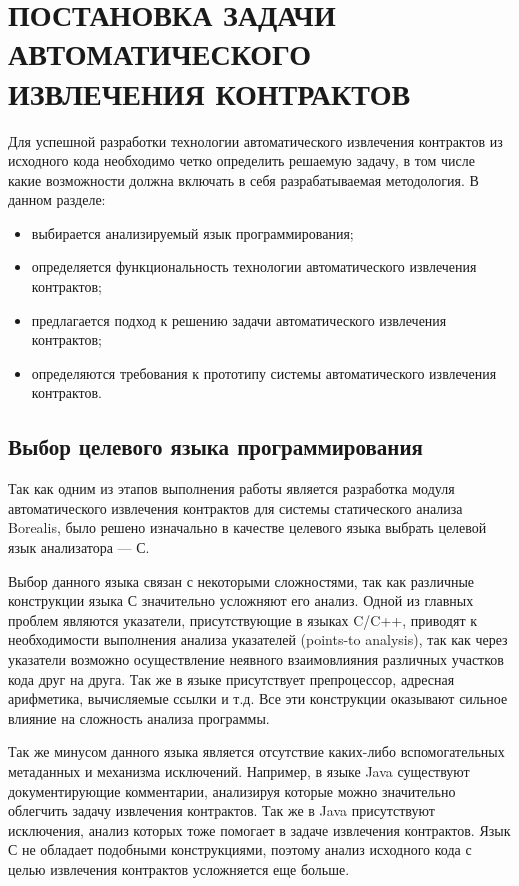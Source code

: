 \chapter{ПОСТАНОВКА ЗАДАЧИ АВТОМАТИЧЕСКОГО ИЗВЛЕЧЕНИЯ КОНТРАКТОВ}
\label{chapter:task}
Для успешной разработки технологии автоматического извлечения контрактов из исходного кода необходимо четко определить решаемую задачу, в том числе какие возможности должна включать в себя разрабатываемая методология. В данном разделе:
\begin{itemize}
\item выбирается анализируемый язык программирования;
\item определяется функциональность технологии автоматического извлечения контрактов;
\item предлагается подход к решению задачи автоматического извлечения контрактов;
\item определяются требования к прототипу системы автоматического извлечения контрактов.
\end{itemize}

\section{Выбор целевого языка программирования}
Так как одним из этапов выполнения работы является разработка модуля автоматического извлечения контрактов для системы статического анализа Borealis\cite{borealis}, было решено изначально в качестве целевого языка выбрать целевой язык анализатора --- С\cite{languageC}.

Выбор данного языка связан с некоторыми сложностями, так как различные конструкции языка С значительно усложняют его анализ. Одной из главных проблем являются указатели, присутствующие в языках C/C++, приводят к необходимости выполнения анализа указателей (points-to analysis), так как через указатели возможно осуществление неявного взаимовлияния различных участков кода друг на друга. Так же в языке присутствует препроцессор, адресная арифметика, вычисляемые ссылки и т.д. Все эти конструкции оказывают сильное влияние на сложность анализа программы.

Так же минусом данного языка является отсутствие каких-либо вспомогательных метаданных и механизма исключений. Например, в языке Java\cite{languageJava} существуют документирующие комментарии, анализируя которые можно значительно облегчить задачу извлечения контрактов. Так же в Java присутствуют исключения, анализ которых тоже помогает в задаче извлечения контрактов. Язык С не обладает подобными конструкциями, поэтому анализ исходного кода с целью извлечения контрактов усложняется еще больше.


